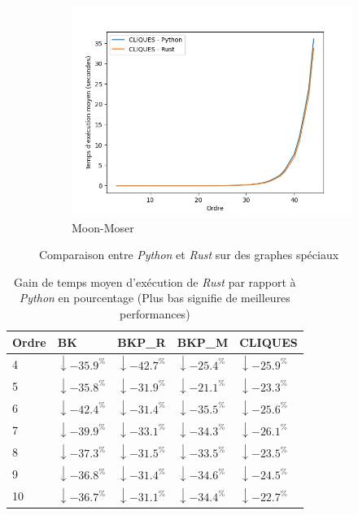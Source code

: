 \documentclass[12pt,a4paper]{article}
\begin{document}
\begin{figure}[h!]
\begin{subfigure}[b]{0.32\textwidth}
    \includegraphics[width=\textwidth]{images/total_CLIQUES_new_pyrust_pivot_turan_plot.png}
  \caption{Moon-Moser}%
  \label{subfig:pr2_cliques_turan}
  \end{subfigure}
  \caption{Comparaison entre \emph{Python} et \emph{Rust} sur des graphes spéciaux}%
  \label{fig:pvr2_all}
\end{figure}
\begin{table}
  \centering
  \begin{tabular}{|l||l|l|l|l|}
    \hline
    Ordre & BK & BKP\_R & BKP\_M & CLIQUES \\
    \hline
    \hline
    4 & $\downarrow-35.9^{\%}$ & $\downarrow-42.7^{\%}$ & $\downarrow-25.4^{\%}$ & $\downarrow-25.9^{\%}$ \\
    5 & $\downarrow-35.8^{\%}$ & $\downarrow-31.9^{\%}$ & $\downarrow-21.1^{\%}$ & $\downarrow-23.3^{\%}$ \\
    6 & $\downarrow-42.4^{\%}$ & $\downarrow-31.4^{\%}$ & $\downarrow-35.5^{\%}$ & $\downarrow-25.6^{\%}$ \\
    7 & $\downarrow-39.9^{\%}$ & $\downarrow-33.1^{\%}$ & $\downarrow-34.3^{\%}$ & $\downarrow-26.1^{\%}$ \\
    8 & $\downarrow-37.3^{\%}$ & $\downarrow-31.5^{\%}$ & $\downarrow-33.5^{\%}$ & $\downarrow-23.5^{\%}$ \\
    9 & $\downarrow-36.8^{\%}$ & $\downarrow-31.4^{\%}$ & $\downarrow-34.6^{\%}$ & $\downarrow-24.5^{\%}$ \\
    10 & $\downarrow-36.7^{\%}$ & $\downarrow-31.1^{\%}$ & $\downarrow-34.4^{\%}$ & $\downarrow-22.7^{\%}$ \\
    \hline
  \end{tabular}
  \caption{Gain de temps moyen d'exécution de \emph{Rust} par rapport à \emph{Python} en pourcentage (Plus bas signifie de meilleures performances)}
  \label{table:rust_total}
\end{table}
\end{document}
